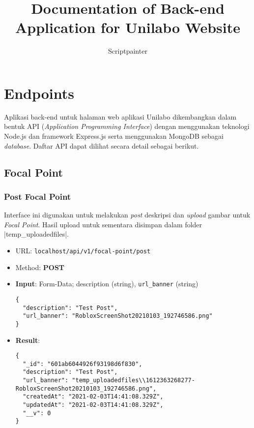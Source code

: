\documentclass[a4paper]{report}
\title{Documentation of Back-end Application for Unilabo Website}
\author{Scriptpainter}
\begin{document}
\maketitle
\onehalfspacing

\tableofcontents
\newpage

\chapter{Endpoints}

Aplikasi back-end untuk halaman web aplikasi Unilabo dikembangkan dalam bentuk API (\textit{Application Programming Interface}) dengan menggunakan teknologi Node.js dan framework Express.js serta menggunakan MongoDB sebagai \textit{database}. Daftar API dapat dilihat secara detail sebagai berikut.

\section{Focal Point}
\subsection{Post Focal Point}
Interface ini digunakan untuk melakukan \textit{post} deskripsi dan \textit{upload} gambar untuk \textit{Focal Point}. Hasil upload untuk sementara disimpan dalam folder \spverb|temp_uploadedfiles|.
\begin{itemize}
  \item URL: \verb|localhost/api/v1/focal-point/post| 
  \item Method: \textbf{POST} 
  \item \textbf{Input}: Form-Data; description (string), \verb|url_banner| (string)
    \begin{lstlisting}
{
  "description": "Test Post",
  "url_banner": "RobloxScreenShot20210103_192746586.png"
}
    \end{lstlisting}
  \item \textbf{Result}:
    \begin{lstlisting}
{
  "_id": "601ab6044926f93198d6f830",
  "description": "Test Post",
  "url_banner": "temp_uploadedfiles\\1612363268277-RobloxScreenShot20210103_192746586.png",
  "createdAt": "2021-02-03T14:41:08.329Z",
  "updatedAt": "2021-02-03T14:41:08.329Z",
  "__v": 0
}
    \end{lstlisting}

\end{itemize}
                    
\end{document}
